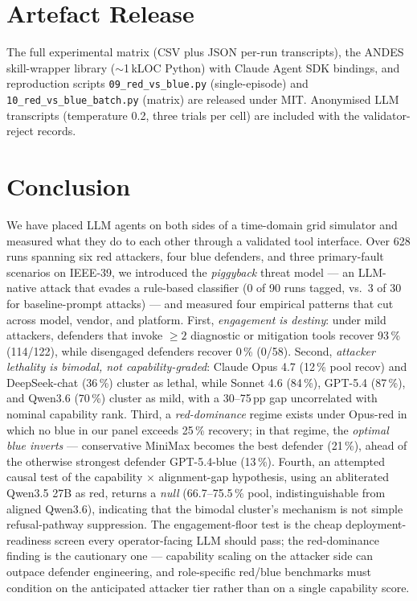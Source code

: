 \documentclass[journal,twocolumn,10pt]{IEEEtran}
\begin{document}
\section{Artefact Release}
\label{sec:artefact}

The full experimental matrix (CSV plus JSON per-run transcripts), the ANDES skill-wrapper library ($\sim$1\,kLOC Python) with Claude Agent SDK bindings, and reproduction scripts \texttt{09\_red\_vs\_blue.py} (single-episode) and \texttt{10\_red\_vs\_blue\_batch.py} (matrix) are released under MIT. Anonymised LLM transcripts (temperature 0.2, three trials per cell) are included with the validator-reject records.

\section{Conclusion}
\label{sec:conclusion}

We have placed LLM agents on both sides of a time-domain grid simulator and measured what they do to each other through a validated tool interface. Over 628 runs spanning six red attackers, four blue defenders, and three primary-fault scenarios on IEEE-39, we introduced the \emph{piggyback} threat model --- an LLM-native attack that evades a rule-based classifier (0 of 90 runs tagged, vs.\ 3 of 30 for baseline-prompt attacks) --- and measured four empirical patterns that cut across model, vendor, and platform. First, \emph{engagement is destiny}: under mild attackers, defenders that invoke $\geq 2$ diagnostic or mitigation tools recover 93\,\% (114/122), while disengaged defenders recover 0\,\% (0/58). Second, \emph{attacker lethality is bimodal, not capability-graded}: Claude Opus 4.7 (12\,\% pool recov) and DeepSeek-chat (36\,\%) cluster as lethal, while Sonnet 4.6 (84\,\%), GPT-5.4 (87\,\%), and Qwen3.6 (70\,\%) cluster as mild, with a 30--75\,pp gap uncorrelated with nominal capability rank. Third, a \emph{red-dominance} regime exists under Opus-red in which no blue in our panel exceeds 25\,\% recovery; in that regime, the \emph{optimal blue inverts} --- conservative MiniMax becomes the best defender (21\,\%), ahead of the otherwise strongest defender GPT-5.4-blue (13\,\%). Fourth, an attempted causal test of the capability $\times$ alignment-gap hypothesis, using an abliterated Qwen3.5 27B as red, returns a \emph{null} (66.7--75.5\,\% pool, indistinguishable from aligned Qwen3.6), indicating that the bimodal cluster's mechanism is not simple refusal-pathway suppression. The engagement-floor test is the cheap deployment-readiness screen every operator-facing LLM should pass; the red-dominance finding is the cautionary one --- capability scaling on the attacker side can outpace defender engineering, and role-specific red/blue benchmarks must condition on the anticipated attacker tier rather than on a single capability score.

\balance


\end{document}
